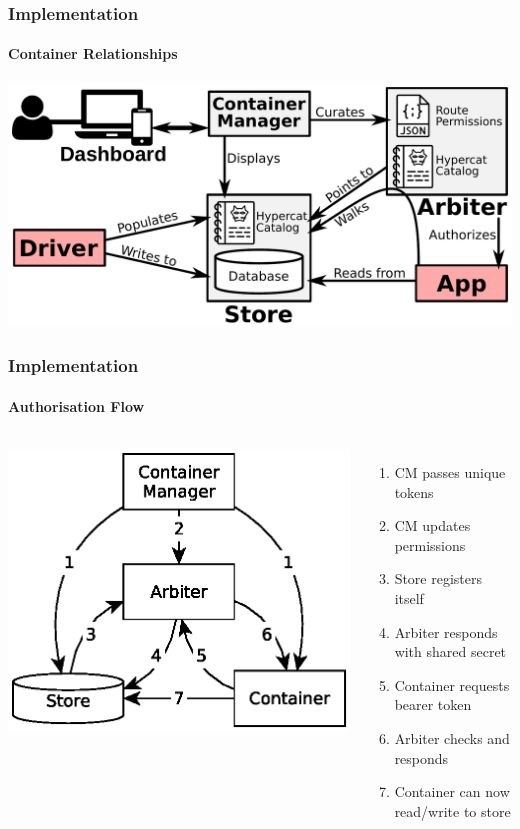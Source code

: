 \documentclass[aspectratio=169]{beamer}
\begin{document}
\begin{frame}
	\frametitle{Implementation}
	\framesubtitle{Container Relationships}
	\centering
	\includegraphics[width=\textwidth]{relations}
\end{frame}

\begin{frame}
	\frametitle{Implementation}
	\framesubtitle{Authorisation Flow}
	\begin{columns}[c]
		\centering
		\includegraphics[width=\textwidth]{auth-flow}
		\begin{enumerate}
			\pause
			\item CM passes unique tokens
			\pause
			\item CM updates permissions
			\pause
			\item Store registers itself
			\pause
			\item Arbiter responds with shared secret
			\pause
			\item Container requests bearer token
			\pause
			\item Arbiter checks and responds
			\pause
			\item Container can now read/write to store
		\end{enumerate}
	\end{columns}
\end{frame}
\end{document}
